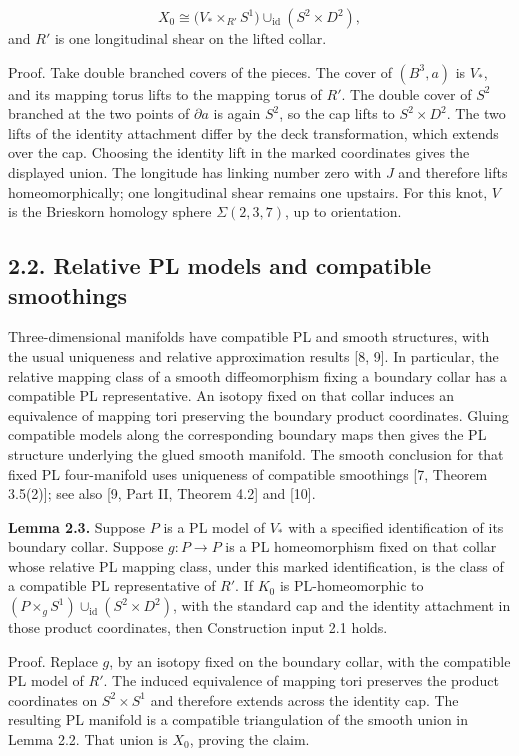 \documentclass[11pt,letterpaper]{article}
\begin{document}
\[
X_0\cong\bigl(V_*\times_{R'}S^1\bigr)\cup_{\mathrm{id}}(S^2\times D^2),
\]
and $R'$ is one longitudinal shear on the lifted collar.

Proof. Take double branched covers of the pieces. The cover of $(B^3,a)$ is $V_*$, and its mapping torus lifts to the mapping torus of $R'$. The double cover of $S^2$ branched at the two points of $\partial a$ is again $S^2$, so the cap lifts to $S^2\times D^2$. The two lifts of the identity attachment differ by the deck transformation, which extends over the cap. Choosing the identity lift in the marked coordinates gives the displayed union. The longitude has linking number zero with $J$ and therefore lifts homeomorphically; one longitudinal shear remains one upstairs. For this knot, $V$ is the Brieskorn homology sphere $\Sigma(2,3,7)$, up to orientation.

\subsection*{2.2. Relative PL models and compatible smoothings}
Three-dimensional manifolds have compatible PL and smooth structures, with the usual uniqueness and relative approximation results [8, 9]. In particular, the relative mapping class of a smooth diffeomorphism fixing a boundary collar has a compatible PL representative. An isotopy fixed on that collar induces an equivalence of mapping tori preserving the boundary product coordinates. Gluing compatible models along the corresponding boundary maps then gives the PL structure underlying the glued smooth manifold. The smooth conclusion for that fixed PL four-manifold uses uniqueness of compatible smoothings [7, Theorem 3.5(2)]; see also [9, Part II, Theorem 4.2] and [10].

\medskip\noindent\textbf{Lemma 2.3.} Suppose $P$ is a PL model of $V_*$ with a specified identification of its boundary collar. Suppose $g:P\to P$ is a PL homeomorphism fixed on that collar whose relative PL mapping class, under this marked identification, is the class of a compatible PL representative of $R'$. If $K_0$ is PL-homeomorphic to $(P\times_g S^1)\cup_{\mathrm{id}}(S^2\times D^2)$, with the standard cap and the identity attachment in those product coordinates, then Construction input 2.1 holds.

Proof. Replace $g$, by an isotopy fixed on the boundary collar, with the compatible PL model of $R'$. The induced equivalence of mapping tori preserves the product coordinates on $S^2\times S^1$ and therefore extends across the identity cap. The resulting PL manifold is a compatible triangulation of the smooth union in Lemma 2.2. That union is $X_0$, proving the claim.
\end{document}
